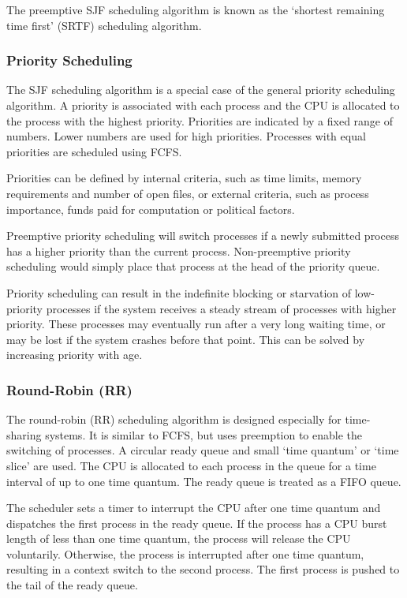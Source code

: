 The preemptive SJF scheduling algorithm is known as the `shortest remaining time first' (SRTF) scheduling algorithm.

\subsubsection{Priority Scheduling}

The SJF scheduling algorithm is a special case of the general priority scheduling algorithm.
A priority is associated with each process and the CPU is allocated to the process with the highest priority.
Priorities are indicated by a fixed range of numbers.
Lower numbers are used for high priorities.
Processes with equal priorities are scheduled using FCFS.

Priorities can be defined by internal criteria, such as time limits, memory requirements and number of open files, or external criteria, such as process importance, funds paid for computation or political factors.

Preemptive priority scheduling will switch processes if a newly submitted process has a higher priority than the current process.
Non-preemptive priority scheduling would simply place that process at the head of the priority queue.

Priority scheduling can result in the indefinite blocking or starvation of low-priority processes if the system receives a steady stream of processes with higher priority.
These processes may eventually run after a very long waiting time, or may be lost if the system crashes before that point.
This can be solved by increasing priority with age.

\subsubsection{Round-Robin (RR)}

The round-robin (RR) scheduling algorithm is designed especially for time-sharing systems.
It is similar to FCFS, but uses preemption to enable the switching of processes.
A circular ready queue and small `time quantum' or `time slice' are used.
The CPU is allocated to each process in the queue for a time interval of up to one time quantum.
The ready queue is treated as a FIFO queue.

The scheduler sets a timer to interrupt the CPU after one time quantum and dispatches the first process in the ready queue.
If the process has a CPU burst length of less than one time quantum, the process will release the CPU voluntarily.
Otherwise, the process is interrupted after one time quantum, resulting in a context switch to the second process.
The first process is pushed to the tail of the ready queue.

